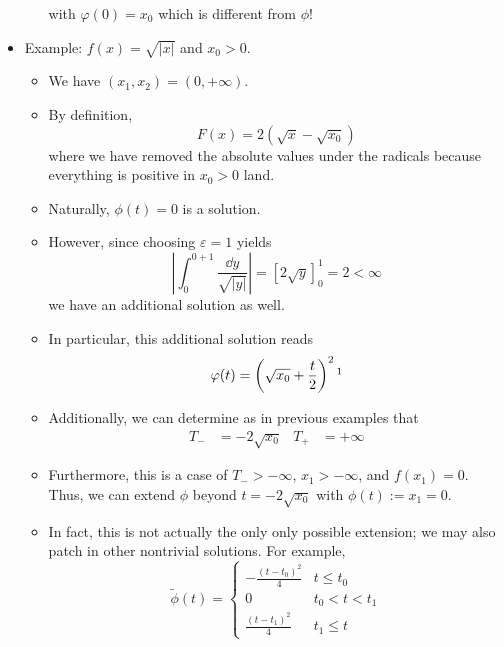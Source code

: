 \documentclass[../notes.tex]{subfiles}
\begin{document}
\begin{itemize}
\begin{itemize}
        with $\varphi(0)=x_0$ which is different from $\phi$!
    \end{itemize}
    \item Example: $f(x)=\sqrt{|x|}$ and $x_0>0$.
    \begin{itemize}
        \item We have $(x_1,x_2)=(0,+\infty)$.
        \item By definition,
        \begin{equation*}
            F(x) = 2(\sqrt{x}-\sqrt{x_0})
        \end{equation*}
        where we have removed the absolute values under the radicals because everything is positive in $x_0>0$ land.
        \item Naturally, $\phi(t)=0$ is a solution.
        \item However, since choosing $\varepsilon=1$ yields
        \begin{equation*}
            \left| \int_0^{0+1}\frac{\dd{y}}{\sqrt{|y|}} \right| = [2\sqrt{y}]_0^1
            = 2
            < \infty
        \end{equation*}
        we have an additional solution as well.
        \item In particular, this additional solution reads
        \begin{equation*}
            \varphi(t) = \left( \sqrt{x_0}+\frac{t}{2} \right)^2\footnotemark
        \end{equation*}
        \item Additionally, we can determine as in previous examples that
        \begin{align*}
            T_- &= -2\sqrt{x_0}&
            T_+ &= +\infty
        \end{align*}
        \item Furthermore, this is a case of $T_->-\infty$, $x_1>-\infty$, and $f(x_1)=0$. Thus, we can extend $\phi$ beyond $t=-2\sqrt{x_0}$ with $\phi(t):=x_1=0$.
        \item In fact, this is not actually the only only possible extension; we may also patch in other nontrivial solutions. For example,
        \begin{equation*}
            \tilde{\phi}(t) =
            \begin{cases}
                -\frac{(t-t_0)^2}{4} & t\leq t_0\\
                0 & t_0<t<t_1\\
                \frac{(t-t_1)^2}{4} & t_1\leq t

\end{cases}
\end{equation*}
\end{itemize}
\end{itemize}
\end{document}
